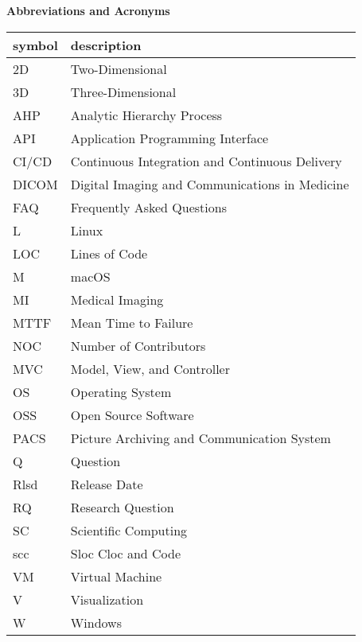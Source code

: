 \begin{center}
\textbf{\large Abbreviations and Acronyms}
\end{center}

\begin{table}[H]
\centering
\begin{tabular}{ll} 
\hline
\textbf{symbol} & \textbf{description}\\
\hline		
2D & Two-Dimensional\\
3D & Three-Dimensional\\
AHP & Analytic Hierarchy Process\\
API & Application Programming Interface\\
CI/CD & Continuous Integration and Continuous Delivery\\
DICOM & Digital Imaging and Communications in Medicine \\
FAQ & Frequently Asked Questions\\
L & Linux \\
LOC & Lines of Code\\
M & macOS\\
MI & Medical Imaging\\
MTTF & Mean Time to Failure\\
NOC &  Number of Contributors\\
MVC & Model, View, and Controller\\
OS & Operating System\\
OSS & Open Source Software\\
PACS & Picture Archiving and Communication System\\
Q & Question\\
Rlsd & Release Date\\
RQ & Research Question\\
SC & Scientific Computing\\
scc & Sloc Cloc and Code\\
VM & Virtual Machine\\
V & Visualization\\
W & Windows\\
\hline		
\end{tabular}\\
\end{table}
